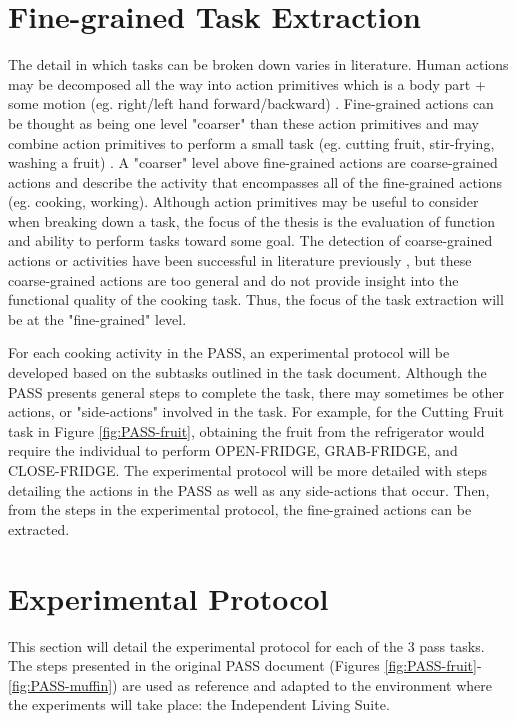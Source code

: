 \clearpage
\section{Fine-grained Task Extraction}
The detail in which tasks can be broken down varies in literature. Human actions may be decomposed all the way into action primitives which is a body part + some motion (eg. right/left hand forward/backward) \cite{huszHumanActivityRecognition2007}. Fine-grained actions can be thought as being one level "coarser" than these action primitives and may combine action primitives to perform a small task (eg. cutting fruit, stir-frying, washing a fruit)  \cite{pan_fine-grained_2020}. A "coarser" level above fine-grained actions are coarse-grained actions and describe the activity that encompasses all of the fine-grained actions (eg. cooking, working). Although action primitives may be useful to consider when breaking down a task, the focus of the thesis is the evaluation of function and ability to perform tasks toward some goal. The detection of coarse-grained actions or activities have been successful in literature previously \cite{cook_learning_2010}, but these coarse-grained actions are too general and do not provide insight into the functional quality of the cooking task. Thus, the focus of the task extraction will be at the "fine-grained" level. 

For each cooking activity in the PASS, an experimental protocol will be developed based on the subtasks outlined in the task document. Although the PASS presents general steps to complete the task, there may sometimes be other actions, or "side-actions" involved in the task. For example, for the Cutting Fruit task in Figure \ref{fig:PASS-fruit}, obtaining the fruit from the refrigerator would require the individual to perform OPEN-FRIDGE, GRAB-FRIDGE, and CLOSE-FRIDGE. The experimental protocol will be more detailed with steps detailing the actions in the PASS as well as any side-actions that occur. Then, from the steps in the experimental protocol, the fine-grained actions can be extracted.

\section{Experimental Protocol}
This section will detail the experimental protocol for each of the 3 pass tasks. The steps presented in the original PASS document (Figures \ref{fig:PASS-fruit}-\ref{fig:PASS-muffin}) are used as reference and adapted to the environment where the experiments will take place: the Independent Living Suite.

